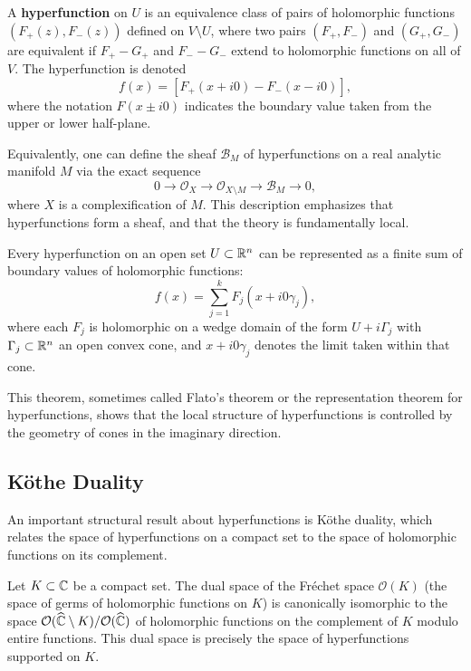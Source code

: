 \begin{definition}
A \textbf{hyperfunction} on \(U\) is an equivalence class of pairs of holomorphic functions \((F_+(z), F_-(z))\) defined on \(V \setminus U\), where two pairs \((F_+, F_-)\) and \((G_+, G_-)\) are equivalent if \(F_+ - G_+\) and \(F_- - G_-\) extend to holomorphic functions on all of \(V\). The hyperfunction is denoted
\[
f(x) = [F_+(x + i0) - F_-(x - i0)],
\]
where the notation \(F(x \pm i0)\) indicates the boundary value taken from the upper or lower half-plane.
\end{definition}

Equivalently, one can define the sheaf \(\mathcal{B}_M\) of hyperfunctions on a real analytic manifold \(M\) via the exact sequence
\[
0 \longrightarrow \mathcal{O}_X \longrightarrow \mathcal{O}_{X \setminus M} \longrightarrow \mathcal{B}_M \longrightarrow 0,
\]
where \(X\) is a complexification of \(M\). This description emphasizes that hyperfunctions form a sheaf, and that the theory is fundamentally local.

\begin{theorem}
Every hyperfunction on an open set \(U \subset \mathbb{R}^n\) can be represented as a finite sum of boundary values of holomorphic functions:
\[
f(x) = \sum_{j=1}^k F_j(x + i0 \gamma_j),
\]
where each \(F_j\) is holomorphic on a wedge domain of the form \(U + i\Gamma_j\) with \(\Gamma_j \subset \mathbb{R}^n\) an open convex cone, and \(x + i0\gamma_j\) denotes the limit taken within that cone.
\end{theorem}

This theorem, sometimes called Flato's theorem or the representation theorem for hyperfunctions, shows that the local structure of hyperfunctions is controlled by the geometry of cones in the imaginary direction.

\subsection{K\"othe Duality}

An important structural result about hyperfunctions is K\"othe duality, which relates the space of hyperfunctions on a compact set to the space of holomorphic functions on its complement.

\begin{theorem}
Let \(K \subset \mathbb{C}\) be a compact set. The dual space of the Fr\'echet space \(\mathcal{O}(K)\) (the space of germs of holomorphic functions on \(K\)) is canonically isomorphic to the space \(\mathcal{O}(\widehat{\mathbb{C}} \setminus K)/\mathcal{O}(\widehat{\mathbb{C}})\) of holomorphic functions on the complement of \(K\) modulo entire functions. This dual space is precisely the space of hyperfunctions supported on \(K\).
\end{theorem}

